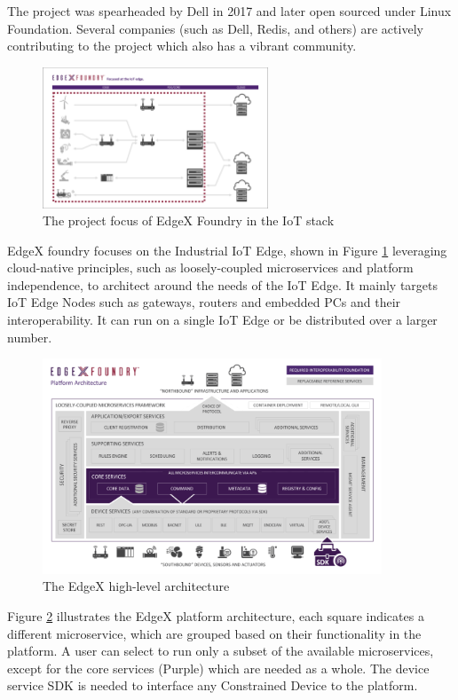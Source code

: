 The project was spearheaded by Dell in 2017 and later open sourced under Linux Foundation. Several companies (such as Dell, Redis, and others) are actively contributing to the project which also has a vibrant community. 

\begin{figure}[h]
    \centering
    \includegraphics[width=0.6\textwidth]{images/edgex_arch1.png}
    \caption{The project focus of EdgeX Foundry in the IoT stack}
    \label{fig:edgex_focus}
\end{figure}

EdgeX foundry focuses on the Industrial IoT Edge, shown in Figure \ref{fig:edgex_focus} leveraging cloud-native principles, such as loosely-coupled microservices and platform independence, to architect around the needs of the IoT Edge. It mainly targets IoT Edge Nodes such as gateways, routers and embedded PCs and their interoperability. It can run on a single IoT Edge or be distributed over a larger number.

\begin{figure}[h]
    \centering
    \includegraphics[width=0.9\textwidth]{images/edgex_arch.png}
    \caption{The EdgeX high-level architecture}
    \label{fig:edgex_arch}
\end{figure}

Figure \ref{fig:edgex_arch} illustrates the EdgeX platform architecture, each square indicates a different microservice, which are grouped based on their functionality in the platform. A user can select to run only a subset of the available microservices, except for the core services (Purple) which are needed as a whole. The device service SDK\cite{device-service-sdk} is needed to interface any Constrained Device to the platform.


